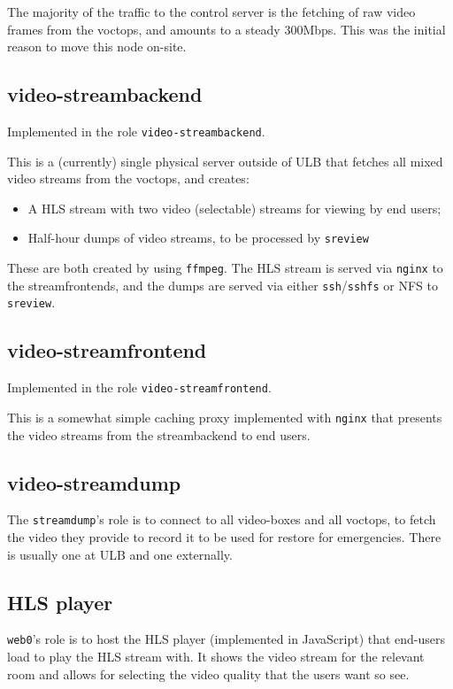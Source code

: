 \documentclass{article}
\begin{document}
The majority of the traffic to the control server is the fetching of raw video
frames from the voctops, and amounts to a steady 300Mbps. This was the initial
reason to move this node on-site.

\subsection{video-streambackend}

Implemented in the role \texttt{video-streambackend}.

This is a (currently) single physical server outside of ULB that fetches all
mixed video streams from the voctops, and creates:

\begin{itemize}
  \item A HLS stream with two video (selectable) streams for viewing by end users;
  \item Half-hour dumps of video streams, to be processed by \texttt{sreview}
\end{itemize}

These are both created by using \texttt{ffmpeg}. The HLS stream is served via
\texttt{nginx} to the streamfrontends, and the dumps are served via either
\texttt{ssh}/\texttt{sshfs} or NFS to \texttt{sreview}.

\subsection{video-streamfrontend}

Implemented in the role \texttt{video-streamfrontend}.

This is a somewhat simple caching proxy implemented with \texttt{nginx} that
presents the video streams from the streambackend to end users.

\subsection{video-streamdump}

The \texttt{streamdump}'s role is to connect to all video-boxes and all
voctops, to fetch the video they provide to record it to be used for restore
for emergencies. There is usually one at ULB and one externally.

\subsection{HLS player}

\texttt{web0}'s role is to host the HLS player (implemented in JavaScript)
that end-users load to play the HLS stream with. It shows the video stream
for the relevant room and allows for selecting the video quality that
the users want so see.
 
\end{document}
